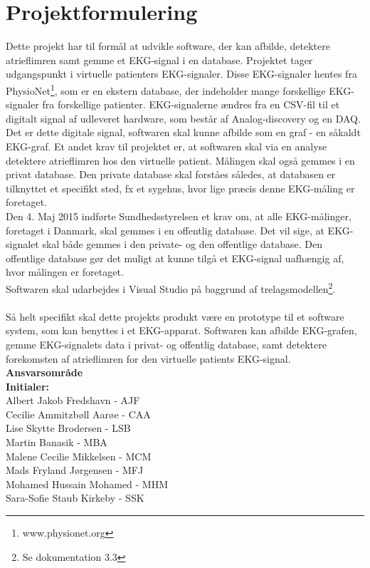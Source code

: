 \chapter{Projektformulering}

Dette projekt har til formål at udvikle software, der kan afbilde, detektere atrieflimren samt gemme et EKG-signal i en database. Projektet tager udgangspunkt i virtuelle patienters EKG-signaler. Disse EKG-signaler hentes fra PhysioNet\footnote{www.physionet.org}, som er en ekstern database, der indeholder mange forskellige EKG-signaler fra forskellige patienter. EKG-signalerne  ændres fra en CSV-fil til et digitalt signal af udleveret hardware, som består af Analog-discovery og en DAQ. \\
Det er dette digitale signal, softwaren skal kunne afbilde som en graf - en såkaldt EKG-graf. Et andet krav til projektet er, at softwaren skal via en analyse detektere atrieflimren hos den virtuelle patient. Målingen skal også gemmes i en privat database. Den private database skal forståes således, at databasen er tilknyttet et specifikt sted, fx et sygehus, hvor lige præcis denne EKG-måling er foretaget. \\
Den 4. Maj 2015 indførte Sundhedsstyrelsen et krav om, at alle EKG-målinger, foretaget i Danmark, skal gemmes i en offentlig database. Det vil sige, at EKG-signalet skal både gemmes i den private- og den offentlige database. Den offentlige database gør det muligt at kunne tilgå et EKG-signal uafhængig af, hvor målingen er foretaget.\\
Softwaren skal udarbejdes i Visual Studio på baggrund af trelagsmodellen\footnote{Se dokumentation 3.3}.\\ \\
Så helt specifikt skal dette projekts produkt være en prototype til et software system, som kan benyttes i et EKG-apparat. Softwaren kan afbilde EKG-grafen, gemme EKG-signalets data i privat- og offentlig database, samt detektere forekomsten af atrieflimren for den virtuelle patients EKG-signal. \\[1ex]


\textbf{Ansvarsområde} \\
\textbf{Initialer: } \\
Albert Jakob Fredshavn - AJF \\
Cecilie Ammitzbøll Aarøe - CAA \\
Lise Skytte Brodersen - LSB \\
Martin Banasik - MBA \\
Malene Cecilie Mikkelsen - MCM \\
Mads Fryland Jørgensen - MFJ \\
Mohamed Hussain Mohamed - MHM \\
Sara-Sofie Staub Kirkeby - SSK \\

